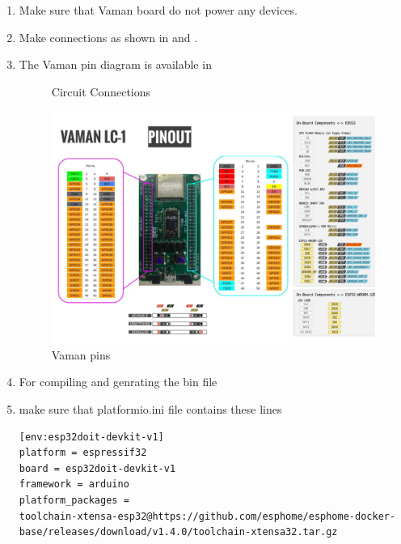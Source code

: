 \renewcommand{\theequation}{\theenumi}
\renewcommand{\thefigure}{\theenumi}
\begin{enumerate}[label=\thesection.\arabic*.,ref=\thesection.\theenumi]
\item Make sure that Vaman board do not power any devices.  
\item Make connections as shown in  and  . 
\item The Vaman pin diagram is available in 
\begin{figure}[!ht]
\centering

\caption{Circuit Connections}
\label{fig:vaman/uart/1}
\end{figure}
\begin{figure}
\centering
\includegraphics[width=\columnwidth]{vaman-esp32/lcd/figs/pin_sheet.png}
\caption{Vaman pins}
\label{fig:vaman-pin_sheet}
\end{figure}
\begin{table}[!ht]

\caption{}
\label{tab:arduino-uart}
\end{table}
\item For compiling and genrating the bin file 
\item make sure that platformio.ini file contains these lines
\begin{lstlisting}
[env:esp32doit-devkit-v1]
platform = espressif32
board = esp32doit-devkit-v1
framework = arduino
platform_packages =                                                               toolchain-xtensa-esp32@https://github.com/esphome/esphome-docker-base/releases/download/v1.4.0/toolchain-xtensa32.tar.gz                             

\end{lstlisting}
\end{enumerate}

